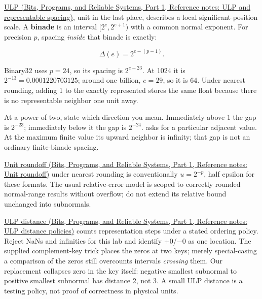 \href{../01-Bits-Programs-and-Reliable-Systems-P01/main.pdf\#appendix-14bab4cab9d4}{ULP (Bits, Programs, and Reliable Systems, Part 1, Reference notes: ULP and representable spacing)}, unit in the last place, describes a local significant-position scale. A \textbf{binade} is an interval \([2^e,2^{e+1})\) with a common normal exponent. For precision \(p\), spacing \emph{inside} that binade is exactly:

\[
\Delta(e)=2^{e-(p-1)}.
\]

Binary32 uses \(p=24\), so its spacing is \(2^{e-23}\). At 1024 it is \(2^{-13}=0.0001220703125\); around one billion, \(e=29\), so it is 64. Under nearest rounding, adding 1 to the exactly represented  stores the same float because there is no representable neighbor one unit away.

At a power of two, state which direction you mean. Immediately above 1 the gap is \(2^{-23}\); immediately below it the gap is \(2^{-24}\).  asks for a particular adjacent value. At the maximum finite value its upward neighbor is infinity; that gap is not an ordinary finite-binade spacing.

\href{../01-Bits-Programs-and-Reliable-Systems-P01/main.pdf\#appendix-bc44f7b42f42}{Unit roundoff (Bits, Programs, and Reliable Systems, Part 1, Reference notes: Unit roundoff)} under nearest rounding is conventionally \(u=2^{-p}\), half epsilon for these formats. The usual relative-error model is scoped to correctly rounded normal-range results without overflow; do not extend its relative bound unchanged into subnormals.

\href{../01-Bits-Programs-and-Reliable-Systems-P01/main.pdf\#appendix-deca299ae4b8}{ULP distance (Bits, Programs, and Reliable Systems, Part 1, Reference notes: ULP distance policies)} counts representation steps under a stated ordering policy. Reject NaNs and infinities for this lab and identify +0/−0 as one location. The supplied complement-key trick places the zeros at two keys; merely special-casing a comparison of the zeros still overcounts intervals \emph{crossing} them. Our replacement collapses zero in the key itself: negative smallest subnormal to positive smallest subnormal has distance 2, not 3. A small ULP distance is a testing policy, not proof of correctness in physical units.

